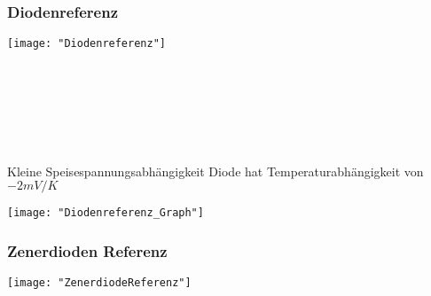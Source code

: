 \subsubsection{Diodenreferenz}
\begin{minipage}[t]{0.3\textwidth}
	\vspace{0pt}								%
	\texttt{[image: "Diodenreferenz"]}
\end{minipage}\hspace{0.05\textwidth}
\begin{minipage}[t]{0.3\textwidth}
	\vspace{0pt}
	\\
	\\
	\\
	\\
	\\
\end{minipage}
\begin{minipage}[t]{0.3\textwidth}
	\vspace{0pt}
	Kleine Speisespannungsabhängigkeit
	Diode hat Temperaturabhängigkeit von $-2 mV/K$
	
	
	\texttt{[image: "Diodenreferenz\_Graph"]}
\end{minipage}
\vspace{2mm}


\subsubsection{Zenerdioden Referenz}
\begin{minipage}[t]{0.3\textwidth}
	\vspace{0pt}								%
	\texttt{[image: "ZenerdiodeReferenz"]}
\end{minipage}\hspace{0.05\textwidth}
\begin{minipage}[t]{0.3\textwidth}
	\vspace{0pt}
\end{minipage}
\begin{minipage}[t]{0.3\textwidth}
	\vspace{0pt}
	
\end{minipage}
\vspace{2mm}


